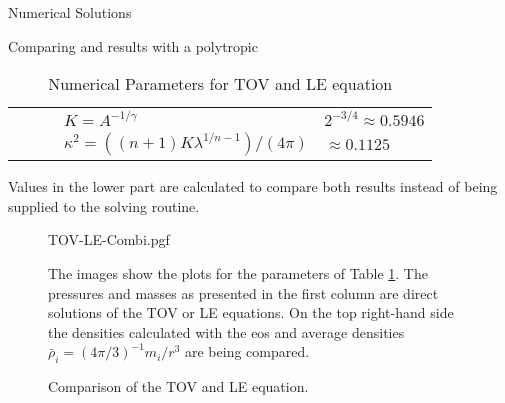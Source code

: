 \begin{section}{Numerical Solutions}
\begin{subsection}{Comparing  and  results with a polytropic }
\begin{table}[H]
{\begin{tabular}{@{}llcll@{}}
		&&& $K=A^{-1/\gamma}$ & $2^{-3/4}\approx0.5946$\\
		&&& $\kappa^2=((n+1)K\lambda^{1/n-1})/(4\pi)$ & $\approx0.1125$\\
		\bottomrule
	\end{tabular}
	}
	\caption[Numerical Parameters for  and LE equation]{Numerical Parameters for \ac{TOV} and \ac{LE} equation}
	\label{4-NumSol-Tbl-TOVParameters}
	\small
	Values in the lower part are calculated to compare both results instead of being supplied to the solving routine.
\end{table}%
\begin{figure}[H]
	{\centering
	{TOV-LE-Combi.pgf}
	}
	\caption[Comparison of the  and  equation]{Comparison of the \ac{TOV} and \ac{LE} equation.}
	\label{4-NumSol-Plt-TOVEqEasyEOS}
	\small
	The images show the plots for the parameters of Table \ref{4-NumSol-Tbl-TOVParameters}.
	The pressures and masses as presented in the first column are direct solutions of the \ac{TOV} or \ac{LE} equations.
	On the top right-hand side the densities calculated with the \ac{eos} and average densities $\bar{\rho}_i=(4\pi/3)^{-1}m_i/r^3$ are being compared.


\end{figure}
\end{subsection}
\end{section}
